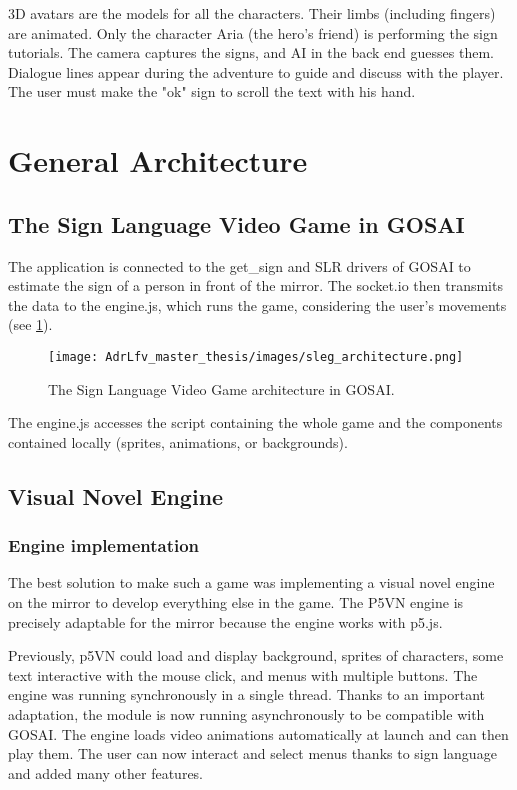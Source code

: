 3D avatars are the models for all the characters. Their limbs (including fingers) are animated. Only the character Aria (the hero's friend) is performing the sign tutorials.
The camera captures the signs, and AI in the back end guesses them. Dialogue lines appear during the adventure to guide and discuss with the player. The user must make the "ok" sign to scroll the text with his hand.



\section{General Architecture}

\subsection{The Sign Language Video Game in GOSAI}

The application is connected to the get\_sign and SLR drivers of GOSAI to estimate the sign of a person in front of the mirror. The socket.io then transmits the data to the engine.js, which runs the game, considering the user's movements (see \ref{fig:sleg_architecture}).

\begin{figure}[h]
    \centering
    \texttt{[image: AdrLfv\_master\_thesis/images/sleg\_architecture.png]}
    \caption{The Sign Language Video Game architecture in GOSAI.}
    \label{fig:sleg_architecture}
\end{figure}

The engine.js accesses the script containing the whole game and the components contained locally (sprites, animations, or backgrounds).

\subsection{Visual Novel Engine}

\subsubsection{Engine implementation}

The best solution to make such a game was implementing a visual novel engine on the mirror to develop everything else in the game. The P5VN engine is precisely adaptable for the mirror because the engine works with p5.js.

Previously, p5VN could load and display background, sprites of characters, some text interactive with the mouse click, and menus with multiple buttons.
The engine was running synchronously in a single thread.
Thanks to an important adaptation, the module is now running asynchronously to be compatible with GOSAI. 
The engine loads video animations automatically at launch and can then play them. The user can now interact and select menus thanks to sign language and added many other features.

